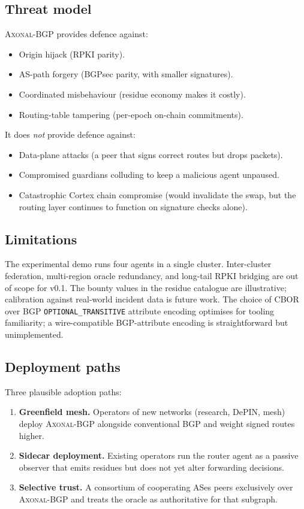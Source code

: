 \documentclass[11pt,twocolumn]{article}
\theoremstyle{definition}
\theoremstyle{plain}
\theoremstyle{remark}
\newcommand{\axonal}{\textsc{Axonal-BGP}}
\newcommand{\code}[1]{\texttt{#1}}
\begin{document}
\subsection{Threat model}

\axonal{} provides defence against:
\begin{itemize}[leftmargin=*,itemsep=2pt]
  \item Origin hijack (RPKI parity).
  \item AS-path forgery (BGPsec parity, with smaller signatures).
  \item Coordinated misbehaviour (residue economy makes it costly).
  \item Routing-table tampering (per-epoch on-chain commitments).
\end{itemize}

\noindent It does \emph{not} provide defence against:
\begin{itemize}[leftmargin=*,itemsep=2pt]
  \item Data-plane attacks (a peer that signs correct routes but drops packets).
  \item Compromised guardians colluding to keep a malicious agent unpaused.
  \item Catastrophic Cortex chain compromise (would invalidate the swap, but the routing layer continues to function on signature checks alone).
\end{itemize}

\subsection{Limitations}

The experimental demo runs four agents in a single cluster. Inter-cluster federation, multi-region oracle redundancy, and long-tail RPKI bridging are out of scope for v0.1. The bounty values in the residue catalogue are illustrative; calibration against real-world incident data is future work. The choice of CBOR over BGP \code{OPTIONAL\_TRANSITIVE} attribute encoding optimises for tooling familiarity; a wire-compatible BGP-attribute encoding is straightforward but unimplemented.

\subsection{Deployment paths}

Three plausible adoption paths:
\begin{enumerate}[leftmargin=*,itemsep=2pt]
  \item \textbf{Greenfield mesh.} Operators of new networks (research, DePIN, mesh) deploy \axonal{} alongside conventional BGP and weight signed routes higher.
  \item \textbf{Sidecar deployment.} Existing operators run the router agent as a passive observer that emits residues but does not yet alter forwarding decisions.
  \item \textbf{Selective trust.} A consortium of cooperating ASes peers exclusively over \axonal{} and treats the oracle as authoritative for that subgraph.
\end{enumerate}
\end{document}

